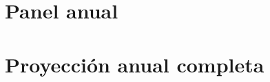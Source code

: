 \documentclass[11pt,a4paper]{article}
\begin{document}
\appendix

\section{Panel anual}\label{ap:panel}

\begin{table}[H]
\centering
\caption{Panel anual utilizado en la estimación.}
\small

\end{table}

\section{Proyección anual completa}\label{ap:proyeccion}

\begin{table}[H]
\centering
\caption{Volumen proyectado por escenario, GWh. La banda corresponde al
intervalo de $\eta$ aplicado al escenario base.}
\small

\end{table}
\end{document}
